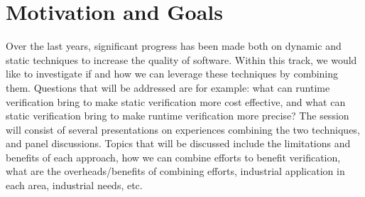 
\section{Motivation and Goals}

Over the last years, significant progress has been made both on dynamic and static techniques to increase the quality of software. Within this track, we would like to investigate if and how we can leverage these techniques by combining them. Questions that will be addressed are for example: what can runtime verification bring to make static verification more cost effective, and what can static verification bring to make runtime verification more precise? The session will consist of several presentations on experiences combining the two techniques, and panel discussions.
Topics that will be discussed include the limitations and benefits of each approach, how we can combine efforts to benefit verification, what are the overheads/benefits of combining efforts, industrial application in each area, industrial needs, etc.

